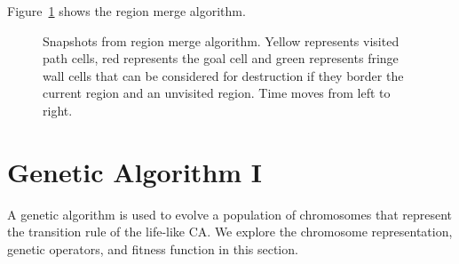 Figure~\ref{fig:region-merge} shows the region merge algorithm.

\begin{figure}[H]
\centering
            \hfill
            \hfill
            \hfill
            \hfill
            \hfill
            \hfill
            \caption{Snapshots from region merge algorithm. Yellow represents visited path cells, red represents the goal cell and green represents fringe wall cells that can be considered for destruction if they border the current region and an unvisited region. Time moves from left to right.}
\label{fig:region-merge}
\end{figure}


\section{Genetic Algorithm I}\label{sec:ga-1}

A genetic algorithm is used to evolve a population of chromosomes that represent the transition rule of the life-like CA. We explore the chromosome representation, genetic operators, and fitness function in this section.

